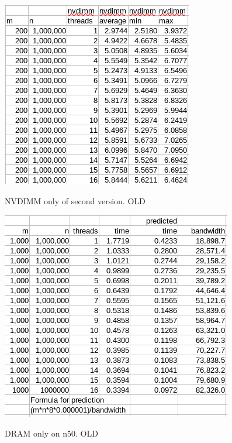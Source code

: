 \documentclass[12pt,a4paper,USenglish]{article}      %
\begin{document}
\begin{table}[!hbtp]
\includegraphics[scale=0.7]{Large_array_test_second_version_NVDIMM_only_v2.png}
\caption{NVDIMM only of second version. OLD}
\end{table}

\begin{table}[!hbtp]
\includegraphics[scale=0.7]{DRAM_only_on_n50.png}
\caption{DRAM only on n50. OLD}
\end{table}

\
\
\
\
\clearpage
\printbibliography


\end{document}
